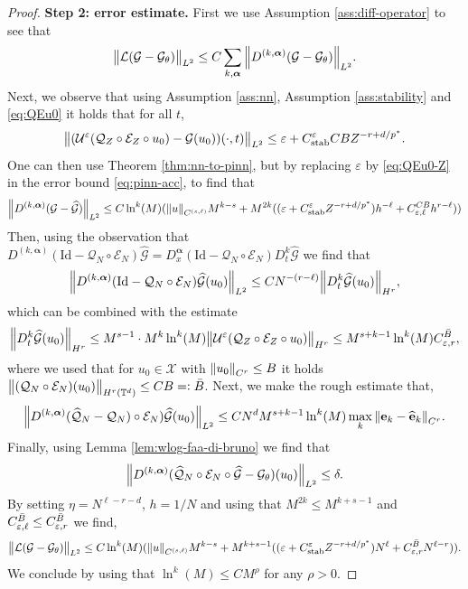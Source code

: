 \documentclass{article}
\numberwithin{equation}{section}
\newcommand{\fb}{\bm{\mathrm{e}}}
\newcommand{\fbhat}{\widehat{\bm{\mathrm{e}}}}
\newcommand{\Id}{\mathrm{Id}}
\newcommand{\T}{\mathbb{T}}
\newcommand{\cE}{\mathcal{E}}
\newcommand{\cG}{\mathcal{G}}
\newcommand{\cL}{\mathcal{L}}
\newcommand{\cQ}{\mathcal{Q}}
\newcommand{\cU}{\mathcal{U}}
\newcommand{\cX}{\mathcal{X}}
\newcommand{\bmalpha}{{\bm{\alpha}}}
\renewcommand{\epsilon}{\varepsilon}
\newcommand{\1}{\mathbbm{1}}
\newcommand{\cGhat}{{\widehat{\cG}}}
\newcommand{\cQhat}{{\widehat{\cQ}}}
\begin{document}
\begin{proof}
\textbf{Step 2: error estimate.}
First we use Assumption \ref{ass:diff-operator} to see that
\begin{equation}
    \norm{\cL(\cG-\cG_\theta)}_{L^2} \leq C \sum_{k,\bmalpha} \norm{D^{(k,\bmalpha)}(\cG-\cG_\theta)}_{L^2}. 
\end{equation}
Next, we observe that using Assumption \ref{ass:nn}, Assumption \ref{ass:stability} and \eqref{eq:QEu0} it holds that for all $t$,
\begin{equation}\label{eq:QEu0-Z}
    \norm{(\cU^\epsilon(\cQ_Z\circ \cE_Z\circ u_0)-\cG(u_0))(\cdot,t)}_{L^2} \leq \epsilon + C^\epsilon_{\mathrm{stab}}CBZ^{-r+d/p^*}. 
\end{equation}
One can then use Theorem \ref{thm:nn-to-pinn}, but by replacing $\epsilon$ by \eqref{eq:QEu0-Z} in the error bound \eqref{eq:pinn-acc}, to find that
\begin{equation}
    \norm{D^{(k,\bmalpha)}(\cG-\cGhat)}_{L^2}\leq C\ln^k(M)(\norm{u}_{C^{(s,\ell)}}M^{k-s}+M^{2k}((\epsilon+C^\epsilon_{\mathrm{stab}}Z^{-r+d/p^*})h^{-\ell}+C^{CB}_{\epsilon,\ell}h^{r-\ell}))
\end{equation}
Then, using the observation that $D^{(k,\bmalpha)}(\Id-\cQ_N\circ \cE_N)\cGhat = D^\bmalpha_x(\Id-\cQ_N\circ \cE_N)D^k_t\cGhat$ we find that
\begin{equation}
     \norm{D^{(k,\bmalpha)}(\Id-\cQ_N\circ \cE_N)\cGhat(u_0)}_{L^2} \leq CN^{-(r-\ell)}\norm{D^k_t\cGhat(u_0)}_{H^{r}},
\end{equation}
which can be combined with the estimate
\begin{equation}
    \norm{D^k_t\cGhat(u_0)}_{H^{r}} \leq M^{s-1}\cdot M^k \ln^k(M) \norm{\cU^\epsilon(\cQ_Z\circ \cE_Z \circ u_0)}_{H^{r}} \leq M^{s+k-1} \ln^k(M) C_{\epsilon,r}^{\Bar{B}},
\end{equation}
where we used that for $u_0\in\cX$ with $\norm{u_0}_{C^r}\leq B$ it holds $\norm{(\cQ_N\circ\cE_N)(u_0)}_{H^r(\T^d)} \leq C B=:\Bar{B}$. Next, we make the rough estimate that,
\begin{equation}
    \norm{D^{(k,\bmalpha)}(\cQhat_N-\cQ_N)\circ \cE_N)\cGhat(u_0)}_{L^2} \leq C N^d M^{s+k-1}\ln^k(M)\max_k\norm{\fb_k-\fbhat_k}_{C^r}. 
\end{equation}
Finally, using Lemma \ref{lem:wlog-faa-di-bruno} we find that
\begin{equation}
    \norm{D^{(k,\bmalpha)}(\cQhat_N\circ \cE_N\circ \cGhat-\cG_\theta)(u_0)}_{L^2}\leq \delta. 
\end{equation}
By setting $\eta = N^{\ell-r-d}$, $h=1/N$ and using that $M^{2k}\leq M^{k+s-1}$ and $C_{\epsilon,\ell}^{\Bar{B}}\leq C_{\epsilon,r}^{\Bar{B}}$ we find, 
\begin{equation}
    \norm{\cL(\cG-\cG_\theta)}_{L^2} \leq C\ln^k(M)(\norm{u}_{C^{(s,\ell)}}M^{k-s}+M^{k+s-1}((\epsilon+C^\epsilon_{\mathrm{stab}}Z^{-r+d/p^*})N^{\ell}+C^{\Bar{B}}_{\epsilon,r}N^{\ell-r})). 
\end{equation}
We conclude by using that $\ln^k(M)\leq CM^\rho$ for any $\rho>0$. 


\end{proof}
\end{document}
